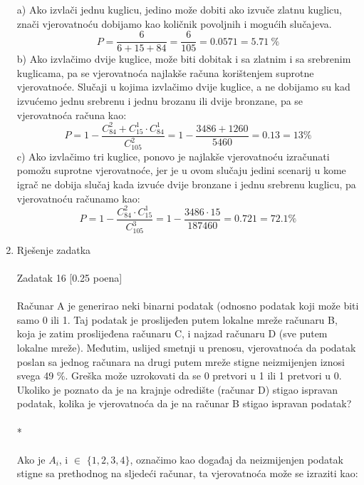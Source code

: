 \documentclass[12pt]{article}
\begin{document}
\begin{enumerate}
		a) Ako izvlači jednu kuglicu, jedino može dobiti ako izvuče zlatnu kuglicu,
        znači vjerovatnoću dobijamo kao količnik povoljnih i mogućih slučajeva.
		\begin{equation*}
		    P = \frac{6}{6+15+84} = \frac{6}{105} = 0.0571 = 5.71 ~\%
		\end{equation*}
		b) Ako izvlačimo dvije kuglice, može biti dobitak i sa zlatnim i sa srebrenim kuglicama, pa se vjerovatnoća najlakše računa korištenjem suprotne vjerovatnoće. Slučaji u kojima izvlačimo dvije kuglice, a ne dobijamo su kad izvućemo jednu srebrenu i jednu brozanu ili dvije bronzane, pa se vjerovatnoća računa kao:
		\begin{equation*}
		    P = 1 - \frac{C^2_{84} + C^1_{15} \cdot C^1_{84}}{C^2_{105}}= 1 - \frac{3486 + 1260}{5460} = 0.13 = 13\%
		\end{equation*}
		\newpage
		c)  Ako izvlačimo tri kuglice, ponovo je najlakše vjerovatnoću izračunati
            pomožu suprotne vjerovatnoće, jer je u ovom slučaju jedini scenarij u
            kome igrač ne dobija slučaj kada izvuće dvije bronzane i jednu srebrenu
            kuglicu, pa vjerovatnoću računamo kao:
		\begin{equation*}
		    P = 1 - \frac{C^2_{84} \cdot C^1_{15}}{C^3_{105}}= 1 - \frac{3486 \cdot 15}{187460} = 0.721 = 72.1\%
		\end{equation*}
		\item Rješenje zadatka \\ 
		\\
		Zadatak 16 [0.25 poena] \\
		\\
Računar A je generirao neki binarni podatak (odnosno podatak koji može biti
samo 0 ili 1. Taj podatak je proslijeđen putem lokalne mreže računaru B, koja
je zatim proslijeđena računaru C, i najzad računaru D (sve putem lokalne
mreže). Međutim, uslijed smetnji u prenosu, vjerovatnoća da podatak poslan
sa jednog računara na drugi putem mreže stigne neizmijenjen iznosi svega
49 \%. Greška može uzrokovati da se 0 pretvori u 1 ili 1 pretvori u 0. Ukoliko je
poznato da je na krajnje odredište (računar D) stigao ispravan podatak, kolika
je vjerovatnoća da je na računar B stigao ispravan podatak? \\
\\
* \\
\\
Ako je $A_i$, i ${\in}$ $\{1, 2, 3, 4\}$, označimo kao događaj da neizmijenjen podatak stigne sa prethodnog na sljedeći računar, ta vjerovatnoća može se izraziti kao:

\end{enumerate}
\end{document}
